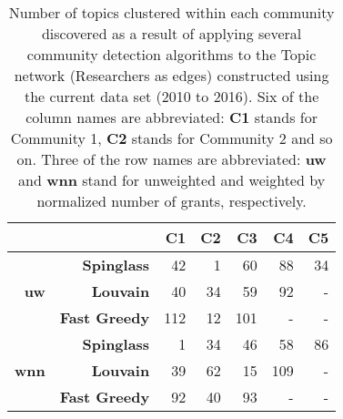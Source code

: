 \begin{table}[!htbp]
\centering
\caption[Number of topics clustered within each community discovered in the Topic network (Researchers as edges) constructed using the current data set (2010 to 2016)]{Number of topics clustered within each community discovered as a result of applying several community detection algorithms to the Topic network (Researchers as edges) constructed using the current data set (2010 to 2016). Six of the column names are abbreviated: \textbf{C1} stands for Community 1, \textbf{C2} stands for Community 2 and so on. Three of the row names are abbreviated: \textbf{uw} and \textbf{wnn} stand for unweighted and weighted by normalized number of grants, respectively.}
\label{table:topic_b_current_numbers_appendix}
\begin{tabular}{r|r|r|r|r|r|r}
\textbf{} & \textbf{} & \textbf{C1} & \textbf{C2} & \textbf{C3} & \textbf{C4} & \textbf{C5}\\
\hline
\multirow{3}{*}{\textbf{uw}}
& \textbf{Spinglass} & {42} & {1} & {60} & {88} & {34}\\
& \textbf{Louvain} & {40} & {34} & {59} & {92} & {-}\\
& \textbf{Fast Greedy} & {112} & {12} & {101} & {-} & {-}\\
\hline
\multirow{3}{*}{\textbf{wnn}}
& \textbf{Spinglass} & {1} & {34} & {46} & {58} & {86}\\
& \textbf{Louvain} & {39} & {62} & {15} & {109} & {-}\\
& \textbf{Fast Greedy} & {92} & {40} & {93} & {-} & {-}\\
\end{tabular}
\end{table}

